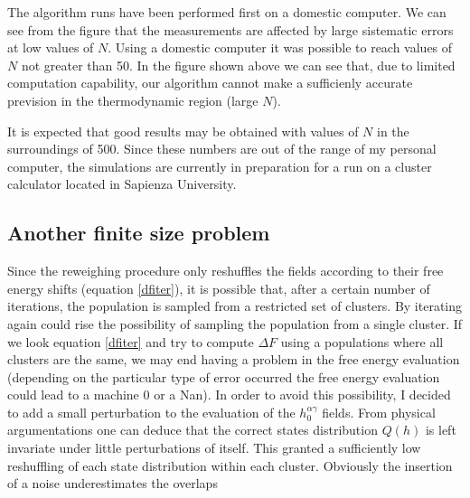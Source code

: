The algorithm runs have been performed first on a domestic computer. We can see from the figure that the measurements are affected by large sistematic errors at low values of $N$. Using a domestic computer it was possible to reach values of $N$ not greater than 50.
In the figure shown above we can see that, due to limited computation capability, our algorithm cannot make a sufficienly accurate prevision in the thermodynamic region (large $N$).

It is expected that good results may be obtained with values of $N$ in the surroundings of 500. Since these numbers are out of the range of my personal computer, the simulations are currently in preparation for a run on a cluster calculator located in Sapienza University.








\subsection{Another finite size problem}

Since the reweighing procedure only reshuffles the fields according to their free energy shifts (equation \ref{dfiter}), it is possible that, after a certain number of iterations, the population is sampled from a restricted set of clusters. By iterating again could rise the possibility of sampling the population from a single cluster. If we look equation \ref{dfiter} and try to compute $\Delta F$ using a populations where all clusters are the same, we may end having a problem in the free energy evaluation (depending on the particular type of error occurred the free energy evaluation could lead to a machine $0$ or a Nan). In order to avoid this possibility, I decided to add a
small perturbation to the evaluation of the $h_0 ^ {\alpha\gamma}$ fields. From physical argumentations \cite{vulpiani} one can deduce that the correct states distribution $Q(h)$ is left invariate under little perturbations of itself. This granted a sufficiently low reshuffling of each state distribution within each cluster. Obviously the insertion of a noise underestimates the overlaps




